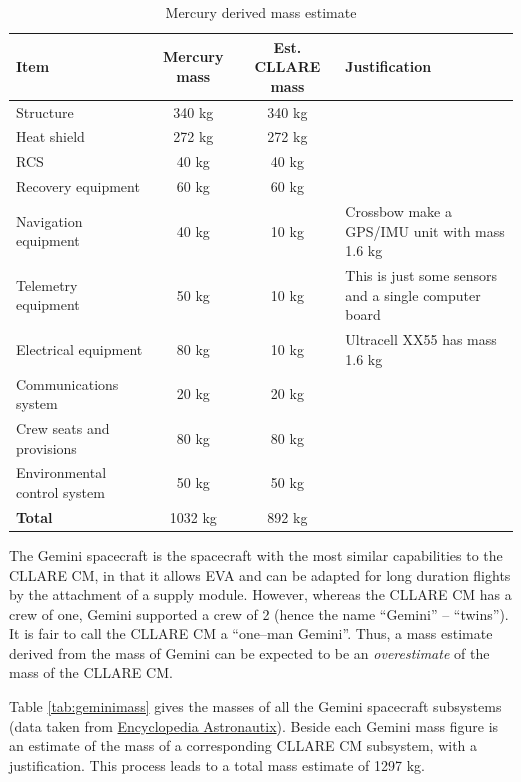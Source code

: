 \documentclass{report}
\begin{document}
\begin{table}
\centering
\begin{tabular}{|l|c|c|l|}
\hline
Item	& Mercury mass & Est. CLLARE mass & Justification \\
\hline \hline
Structure		& 340 kg	& 340 kg & \\
Heat shield		& 272 kg	& 272 kg & \\
RCS			& 40 kg		& 40 kg & \\
Recovery equipment	& 60 kg		& 60 kg & \\
Navigation equipment	& 40 kg		& 10 kg & Crossbow make a GPS/IMU unit with mass 1.6 kg \\
Telemetry equipment	& 50 kg		& 10 kg & This is just some sensors and a single computer board \\
Electrical equipment	& 80 kg		& 10 kg & Ultracell XX55 has mass 1.6 kg \\
Communications system	& 20 kg		& 20 kg & \\
Crew seats and provisions & 80 kg	& 80 kg & \\
Environmental control system	& 50 kg		& 50 kg & \\
\hline \hline
\textbf{Total}	& 1032 kg & 892 kg	& \\
\hline
\end{tabular}
\caption{Mercury derived mass estimate}
\label{tab:mercurymass}
\end{table} 

The Gemini spacecraft is the spacecraft with the most similar capabilities to the CLLARE CM, in that it allows EVA and can be adapted for long duration flights by the attachment of a supply module.  However, whereas the CLLARE CM has a crew of one, Gemini supported a crew of 2 (hence the name ``Gemini'' -- ``twins'').  It is fair to call the CLLARE CM a ``one--man Gemini''.  Thus, a mass estimate derived from the mass of Gemini can be expected to be an \emph{overestimate} of the mass of the CLLARE CM.

Table \ref{tab:geminimass} gives the masses of all the Gemini spacecraft subsystems (data taken from \href{http://www.astronautix.com/craft/gemini.htm}{Encyclopedia Astronautix}).  Beside each Gemini mass figure is an estimate of the mass of a corresponding CLLARE CM subsystem, with a justification.  This process leads to a total mass estimate of 1297 kg.
\end{document}
